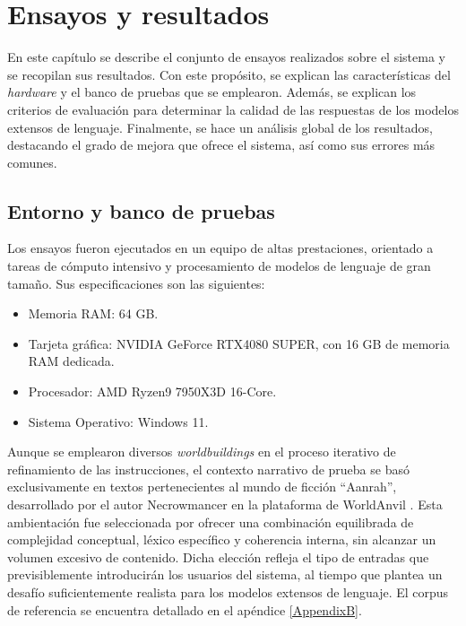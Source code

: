 
\chapter{Ensayos y resultados} %

\label{Chapter4} %
En este capítulo se describe el conjunto de ensayos realizados sobre el sistema y se recopilan sus resultados.
Con este propósito, se explican las características del \textit{hardware} y el banco de pruebas que se emplearon.
Además, se explican los criterios de evaluación para determinar la calidad de las respuestas de los
modelos extensos de lenguaje.
Finalmente, se hace un análisis global de los resultados, destacando el grado de mejora que ofrece el sistema, así como
sus errores más comunes.


\section{Entorno y banco de pruebas}
Los ensayos fueron ejecutados en un equipo de altas prestaciones, orientado a tareas de cómputo intensivo y procesamiento de modelos de lenguaje de gran tamaño.
Sus especificaciones son las siguientes:
\begin{itemize}
\item Memoria RAM: 64 GB.
\item Tarjeta gráfica: NVIDIA GeForce RTX4080 SUPER, con 16 GB de memoria RAM dedicada.
\item Procesador: AMD Ryzen9 7950X3D 16-Core.
\item Sistema Operativo: Windows 11.
\end{itemize}

Aunque se emplearon diversos \textit{worldbuildings} en el proceso iterativo de refinamiento de las instrucciones,
el contexto narrativo de prueba se basó exclusivamente en textos pertenecientes al mundo de ficción ``Aanrah'',
desarrollado por el autor Necrowmancer en la plataforma de WorldAnvil \cite{aanrah2024}.
Esta ambientación fue seleccionada por ofrecer una combinación equilibrada de complejidad conceptual,
léxico específico y coherencia interna, sin alcanzar un volumen excesivo de contenido.
Dicha elección refleja el tipo de entradas que previsiblemente introducirán los usuarios del sistema,
al tiempo que plantea un desafío suficientemente realista para los modelos extensos de lenguaje.
El corpus de referencia se encuentra detallado en el apéndice \ref{AppendixB}.

